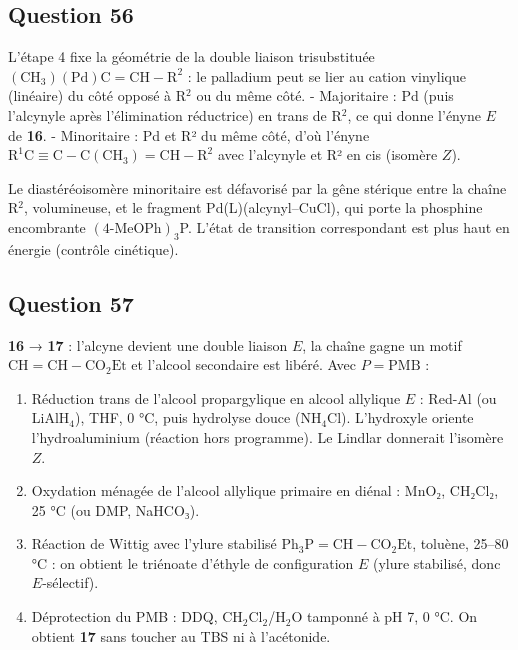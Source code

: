 \documentclass[11pt,a4paper]{article}
\providecommand{\tightlist}{\setlength{\itemsep}{0pt}\setlength{\parskip}{0pt}}
\begin{document}
\hypertarget{question-56}{%
\subsection{Question 56}\label{question-56}}

L'étape 4 fixe la géométrie de la double liaison trisubstituée \(\mathrm{(CH_3)(Pd)C{=}CH{-}R^2}\) : le palladium peut se lier au cation vinylique (linéaire) du côté opposé à R\(^2\) ou du même côté.
- Majoritaire : Pd (puis l'alcynyle après l'élimination réductrice) en trans de R\(^2\), ce qui donne l'ényne \(E\) de \textbf{16}.
- Minoritaire : Pd et R² du même côté, d'où l'ényne \(\mathrm{R^1C{\equiv}C{-}C(CH_3){=}CH{-}R^2}\) avec l'alcynyle et R² en cis (isomère \(Z\)).

Le diastéréoisomère minoritaire est défavorisé par la gêne stérique entre la chaîne R\(^2\), volumineuse, et le fragment Pd(L)(alcynyl--CuCl), qui porte la phosphine encombrante \((4\text{-MeOPh})_3\)P. L'état de transition correspondant est plus haut en énergie (contrôle cinétique).

\hypertarget{question-57}{%
\subsection{Question 57}\label{question-57}}

\textbf{16} → \textbf{17} : l'alcyne devient une double liaison \(E\), la chaîne gagne un motif \(\mathrm{CH{=}CH{-}CO_2Et}\) et l'alcool secondaire est libéré. Avec \(P=\mathrm{PMB}\) :

\begin{enumerate}
\def\labelenumi{\arabic{enumi}.}
\tightlist
\item
  Réduction trans de l'alcool propargylique en alcool allylique \(E\) : Red-Al (ou LiAlH\(_4\)), THF, 0 °C, puis hydrolyse douce (NH\(_4\)Cl). L'hydroxyle oriente l'hydroaluminium (réaction hors programme). Le Lindlar donnerait l'isomère \(Z\).
\item
  Oxydation ménagée de l'alcool allylique primaire en diénal : MnO₂, CH₂Cl₂, 25 °C (ou DMP, NaHCO₃).
\item
  Réaction de Wittig avec l'ylure stabilisé \(\mathrm{Ph_3P{=}CH{-}CO_2Et}\), toluène, 25--80 °C : on obtient le triénoate d'éthyle de configuration \(E\) (ylure stabilisé, donc \(E\)-sélectif).
\item
  Déprotection du PMB : DDQ, CH\(_2\)Cl\(_2\)/H\(_2\)O tamponné à pH 7, 0 °C. On obtient \textbf{17} sans toucher au TBS ni à l'acétonide.
\end{enumerate}
\end{document}
